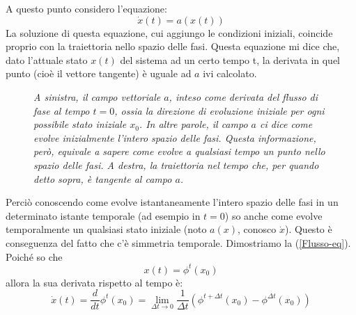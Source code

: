 \documentclass[a4paper,openany]{article}
\begin{document}
	A questo punto considero l'equazione:
	\begin{equation}
		\dot{x}(t) = a(x(t))
		\label{Flusso-eq}
	\end{equation}
	La soluzione di questa equazione, cui aggiungo le condizioni iniziali, coincide proprio con la traiettoria nello spazio delle fasi. Questa equazione mi dice che, dato l'attuale stato $x(t)$ del sistema ad un certo tempo t, la derivata in quel punto (cioè il vettore tangente) è uguale ad $a$ ivi calcolato.
	\begin{figure}[H]
		\centering
		\caption{\textit{A sinistra, il campo vettoriale $a$, inteso come derivata del flusso di fase al tempo $t=0$, ossia la direzione di evoluzione iniziale per ogni possibile stato iniziale $x_{0}$. In altre parole, il campo $a$ ci dice come evolve inizialmente l'intero spazio delle fasi. Questa informazione, però, equivale a sapere come evolve a qualsiasi tempo un punto nello spazio delle fasi. A destra, la traiettoria nel tempo che, per quando detto sopra, è tangente al campo $a$.}}
	\end{figure}
	Perciò conoscendo come evolve istantaneamente l'intero spazio delle fasi in un determinato istante temporale (ad esempio in $t=0$) so anche come evolve temporalmente un qualsiasi stato iniziale (noto $a(x)$, conosco $\dot{x}$). Questo è conseguenza del fatto che c'è simmetria temporale.
	Dimostriamo la (\ref{Flusso-eq}). Poiché so che
	$$
	x(t) = \phi^{t}(x_{0})
	$$
	allora la sua derivata rispetto al tempo è:
	$$
	\dot{x}(t) = \dfrac{d}{dt}\phi^{t}(x_{0}) = \lim_{\Delta t \to 0} \dfrac{1}{\Delta t}(\phi^{t+\Delta t}(x_{0})-\phi^{\Delta t}(x_{0}))
	$$
\end{document}
